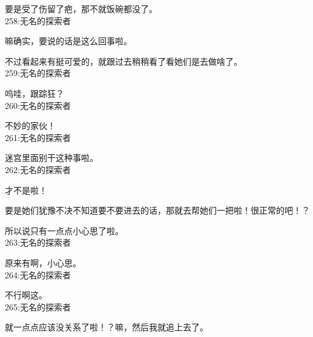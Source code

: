 要是受了伤留了疤，那不就饭碗都没了。\\

258:无名的探索者

嘛确实，要说的话是这么回事啦。

不过看起来有挺可爱的，就跟过去稍稍看了看她们是去做啥了。\\

259:无名的探索者

呜哇，跟踪狂？\\

260:无名的探索者

不妙的家伙！\\

261:无名的探索者

迷宫里面别干这种事啦。\\

262:无名的探索者

才不是啦！

要是她们犹豫不决不知道要不要进去的话，那就去帮她们一把啦！很正常的吧！？

所以说只有一点点小心思了啦。\\

263:无名的探索者

原来有啊，小心思。\\

264:无名的探索者

不行啊这。\\

265:无名的探索者

就一点点应该没关系了啦！？嘛，然后我就追上去了。\\

